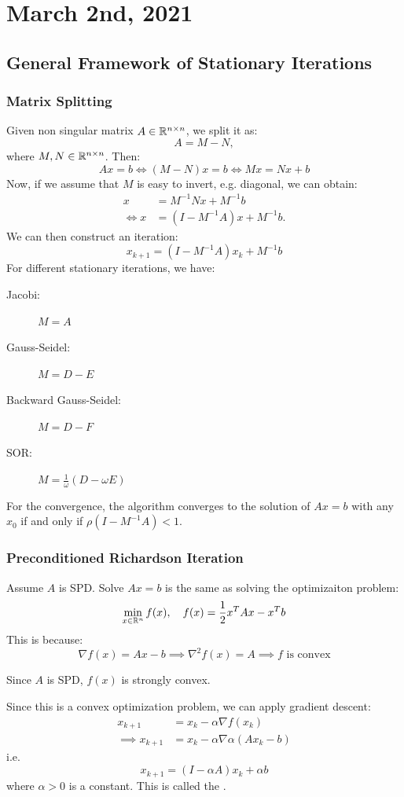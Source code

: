 \documentclass[../main/main.tex]{subfiles}
\begin{document}
\section{March 2nd, 2021}
\subsection{General Framework of Stationary Iterations}
\subsubsection{Matrix Splitting}
Given non singular matrix $A \in \mathbb{R} ^{n\times n}$, we split it as: \[
A = M-N,
\] where $M,N \in \mathbb{R} ^{n \times  n}$. Then: \[
Ax = b \iff  (M-N)x = b \iff  Mx = Nx + b
\]
Now, if we assume that $M$ is easy to invert, e.g. diagonal, we can obtain:
\begin{align*}
  x &= M^{-1} N x + M^{-1} b \\
\iff   x &= (I-M^{-1}A)x +M^{-1} b
  .\end{align*}
We can then construct an iteration: \[
x_{k+1} = (I-M^{-1} A) x_{k} + M^{-1} b
\]
For different stationary iterations, we have:
\begin{description}
\item[Jacobi:] $M=A$
\item[Gauss-Seidel:] $M=D-E$
\item[Backward Gauss-Seidel:] $M=D-F$
\item[SOR:] $M=\frac{1}{\omega }(D-\omega E)$
\end{description}
For the convergence, the algorithm converges to the solution of $Ax=b$ with any $x_{0}$ if and only if $\rho (I-M^{-1} A)<1$.

\subsubsection{Preconditioned Richardson Iteration}
Assume $A$ is SPD. Solve $Ax=b$ is the same as solving the optimizaiton problem: \[
\min_{x\in \mathbb{R} ^{n}}f(x), \quad f(x) = \frac{1}{2} x^{T}Ax - x^{T}b
\] This is because: \[
\nabla f(x) = Ax-b \implies  \nabla^2f(x) = A \implies  f\text{ is convex}
\]
\begin{remark}
Since $A$ is SPD, $f(x)$ is strongly convex.
\end{remark}
Since this is a convex optimization problem, we can apply gradient descent:
\begin{align*}
x_{k+1} &= x_{k} - \alpha \nabla f(x_{k}) \\
  \implies
x_{k+1} &= x_{k} - \alpha \nabla \alpha (Ax_{k}-b)
  \end{align*}
  i.e. \[
    x_{k+1} = (I-\alpha A) x_{k} + \alpha  b
  \]where $\alpha  > 0$ is a constant. This is called the .
\end{document}
